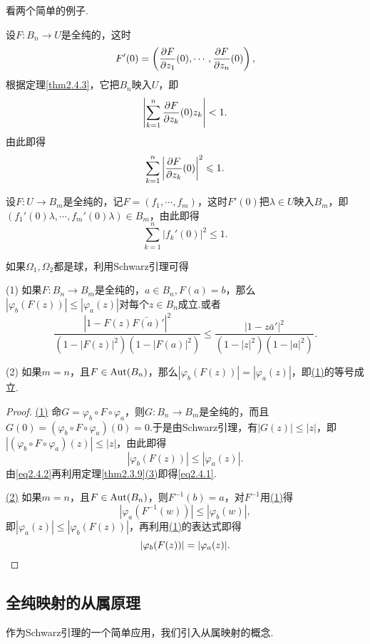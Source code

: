 看两个简单的例子.
\begin{example}\label{exa2.4.4}
	设$F\colon B_n\to U$是全纯的，这时
	\[F'(0)=\left(\frac{\partial F}{\partial z_1}(0),\cdots,\frac{\partial F}{\partial z_n}(0)\right),\]
	根据定理\ref{thm2.4.3}，它把$B_n$映入$U$，即
	\[\left|\sum_{k=1}^{n}\frac{\partial F}{\partial z_k}(0)z_k\right|<1.\]
	由此即得
	\[\sum_{k=1}^{n}\left|\frac{\partial F}{\partial z_k}(0)\right|^2\leqslant1.\]
\end{example}
\begin{example}\label{exa2.4.5}
	设$F\colon U\to B_m$是全纯的，记$F=(f_1,\cdots,f_m)$，这时$F'(0)$把$\lambda\in U$映入$B_m$，即$(f_1'(0)\lambda,\cdots,f_m'(0)\lambda)\in B_m$，由此即得
	\[\sum_{k=1}^{n}|f_k'(0)|^2 \le1.\]
\end{example}
如果$\Omega_1,\Omega_2$都是球，利用Schwarz引理可得
\begin{theorem}\label{thm2.4.6}
	(1)\hypertarget{2.4.6}{}
	如果$F\colon B_n\to B_m$是全纯的，$a\in B_n,F(a)=b$，那么$|\varphi_b(F(z))|\le|\varphi_a(z)|$对每个$z\in B_n$成立.或者
	\begin{equation}\label{eq2.4.1}
		\frac{\left|1-F(z)\bar{F(a)}'\right|^2}{(1-\left|F(z)\right|^2)(1-\left|F(a)\right|^2)}\le\frac{\left|1-z\bar{a}'\right|^2}{(1-|z|^2)(1-|a|^2)}.
	\end{equation}
	
	(2)\hypertarget{2.4.6}{}
	如果$m=n$，且$F\in\operatorname{Aut}(B_n)$，那么$|\varphi_b(F(z))|=|\varphi_a(z)|$，即\hyperlink{2.4.6}{(1)}的等号成立.
\end{theorem}
\begin{proof}
	\hyperlink{2.4.6}{(1)} 命$G=\varphi_b\circ F\circ\varphi_a$，则$G\colon B_n\to B_m$是全纯的，而且$G(0)=(\varphi_b\circ F\circ\varphi_a)(0)=0$.于是由Schwarz引理，有$|G(z)|\le|z|$，即$|(\varphi_b\circ F\circ\varphi_a)(z)|\le|z|$，由此即得
	\begin{equation}\label{eq2.4.2}
		|\varphi_b(F(z))|\le|\varphi_a(z)|.
	\end{equation}
由\eqref{eq2.4.2}再利用定理\ref{thm2.3.9}\hyperlink{2.3.9}{(3)}即得\eqref{eq2.4.1}.

\hyperlink{2.4.6}{(2)}
如果$m=n$，且$F\in\operatorname{Aut}(B_n)$，则$F^{-1}(b)=a$，对$F^{-1}$用\hyperlink{2.4.6}{(1)}得
\[|\varphi_a(F^{-1}(w))|\le|\varphi_b(w)|,\]
即$|\varphi_a(z)|\le|\varphi_b(F(z))|$，再利用\hyperlink{2.4.6}{(1)}的表达式即得
\[|\varphi_b(F(z))|=|\varphi_a(z)|.\qedhere\]
\end{proof}
\subsection{全纯映射的从属原理}
作为Schwarz引理的一个简单应用，我们引入从属映射的概念.

